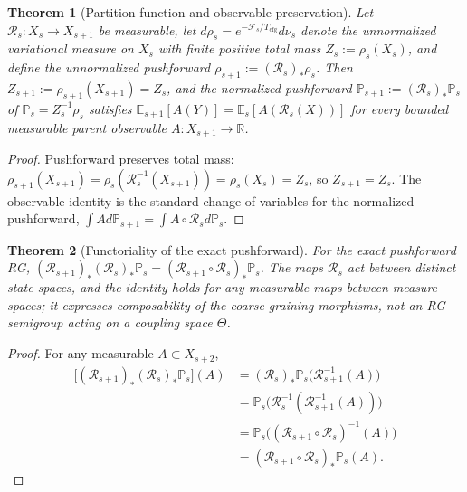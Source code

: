 \documentclass[11pt]{article}
\newtheorem{theorem}{Theorem}
\begin{document}
\begin{theorem}[Partition function and observable preservation]
\label{thm:rg_pushforward}
Let $\mathcal{R}_s : X_s \to X_{s+1}$ be measurable, let $d\rho_s = e^{-\mathcal{F}_s/T_{\mathrm{cfg}}}d\nu_s$ denote the unnormalized variational measure on $X_s$ with finite positive total mass $Z_s := \rho_s(X_s)$, and define the unnormalized pushforward $\rho_{s+1} := (\mathcal{R}_s)_*\rho_s$. Then $Z_{s+1} := \rho_{s+1}(X_{s+1}) = Z_s$, and the normalized pushforward $\mathbb{P}_{s+1} := (\mathcal{R}_s)_*\mathbb{P}_s$ of $\mathbb{P}_s = Z_s^{-1}\rho_s$ satisfies $\mathbb{E}_{s+1}[A(Y)] = \mathbb{E}_s[A(\mathcal{R}_s(X))]$ for every bounded measurable parent observable $A : X_{s+1} \to \mathbb{R}$.
\end{theorem}

\begin{proof}
Pushforward preserves total mass: $\rho_{s+1}(X_{s+1}) = \rho_s(\mathcal{R}_s^{-1}(X_{s+1})) = \rho_s(X_s) = Z_s$, so $Z_{s+1} = Z_s$. The observable identity is the standard change-of-variables for the normalized pushforward, $\int A  d\mathbb{P}_{s+1} = \int A\circ\mathcal{R}_s  d\mathbb{P}_s$.
\end{proof}

\begin{theorem}[Functoriality of the exact pushforward]
\label{thm:rg_semigroup}
For the exact pushforward RG, $(\mathcal{R}_{s+1})_*(\mathcal{R}_s)_*\mathbb{P}_s = (\mathcal{R}_{s+1} \circ \mathcal{R}_s)_*\mathbb{P}_s$. The maps $\mathcal{R}_s$ act between distinct state spaces, and the identity holds for any measurable maps between measure spaces; it expresses composability of the coarse-graining morphisms, not an RG semigroup acting on a coupling space $\Theta$.
\end{theorem}

\begin{proof}
For any measurable $A \subset X_{s+2}$,
\begin{align*}
\big[(\mathcal{R}_{s+1})_*(\mathcal{R}_s)_*\mathbb{P}_s\big](A)
 &= (\mathcal{R}_s)_*\mathbb{P}_s\big(\mathcal{R}_{s+1}^{-1}(A)\big) \\
 &= \mathbb{P}_s\big(\mathcal{R}_s^{-1}(\mathcal{R}_{s+1}^{-1}(A))\big) \\
 &= \mathbb{P}_s\big((\mathcal{R}_{s+1} \circ \mathcal{R}_s)^{-1}(A)\big) \\
 &= (\mathcal{R}_{s+1} \circ \mathcal{R}_s)_*\mathbb{P}_s(A).
\end{align*}
\end{proof}
\end{document}
